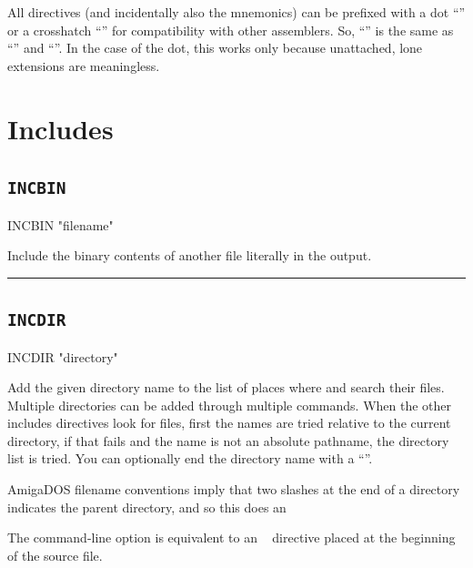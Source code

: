 All directives (and incidentally also the mnemonics) can be prefixed with a dot ``'' or a crosshatch ``\mono{\#}'' for compatibility with other assemblers. So, ``'' is the same as ``'' and ``''. In the case of the dot, this works only because unattached, lone  extensions are meaningless.

\section{Includes}
\subsection{\texttt{INCBIN}}
\label{pseudoop:incbin}

\begin{usage}
  INCBIN "filename"
\end{usage}

Include the binary contents of another file literally in the output.\\
\hrule

\subsection{\texttt{INCDIR}}
\label{pseudoop:incdir}

\begin{usage}
  INCDIR "directory"
\end{usage}

Add the given directory name to the list of places where
 and  search their files. Multiple directories can be added through multiple  commands. When the other includes directives look for files, first the names are tried relative to the current directory, if that fails and
the name is not an absolute pathname, the directory list is tried.
You can optionally end the directory name with a ``\mono{/}''. 

{\color{todo}AmigaDOS filename conventions imply that two slashes at the end of a directory indicates the parent directory, and so this does an ~}
	
The command-line option  is equivalent to an ~ directive placed at the beginning of the source file.

